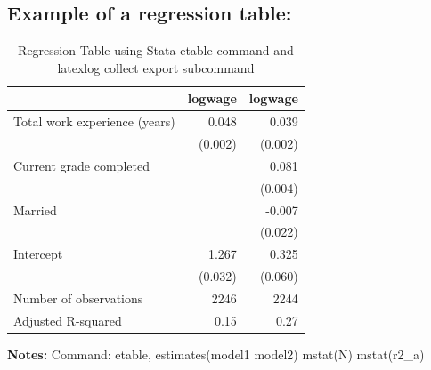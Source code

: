 \documentclass{article}
\begin{document}
\subsection{Example of a regression table:}
\begin{table}[htbp] 
\centering 
\begin{threeparttable} 
\caption{Regression Table using Stata etable command and latexlog collect export subcommand} 

\centering
\begin{tabular}{lll}
\toprule
\multicolumn{1}{r}{} &
  \multicolumn{1}{c}{logwage} &
  \multicolumn{1}{c}{logwage} \\
\midrule
\multicolumn{1}{l}{Total work experience (years)} &
  \multicolumn{1}{r}{0.048} &
  \multicolumn{1}{r}{0.039} \\
\multicolumn{1}{l}{} &
  \multicolumn{1}{r}{(0.002)} &
  \multicolumn{1}{r}{(0.002)} \\
\multicolumn{1}{l}{Current grade completed} &
  \multicolumn{1}{r}{} &
  \multicolumn{1}{r}{0.081} \\
\multicolumn{1}{l}{} &
  \multicolumn{1}{r}{} &
  \multicolumn{1}{r}{(0.004)} \\
\multicolumn{1}{l}{Married} &
  \multicolumn{1}{r}{} &
  \multicolumn{1}{r}{-0.007} \\
\multicolumn{1}{l}{} &
  \multicolumn{1}{r}{} &
  \multicolumn{1}{r}{(0.022)} \\
\multicolumn{1}{l}{Intercept} &
  \multicolumn{1}{r}{1.267} &
  \multicolumn{1}{r}{0.325} \\
\multicolumn{1}{l}{} &
  \multicolumn{1}{r}{(0.032)} &
  \multicolumn{1}{r}{(0.060)} \\
\multicolumn{1}{l}{Number of observations} &
  \multicolumn{1}{r}{2246} &
  \multicolumn{1}{r}{2244} \\
\multicolumn{1}{l}{Adjusted R-squared} &
  \multicolumn{1}{r}{0.15} &
  \multicolumn{1}{r}{0.27} \\
\bottomrule
\end{tabular}

 \footnotesize  
\textbf{Notes:} Command: etable, estimates(model1 model2) mstat(N) mstat(r2\_a) 
\end{threeparttable} 
\end{table}
\end{document}

